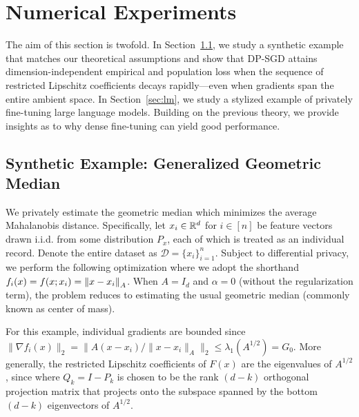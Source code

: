 \section{Numerical Experiments}\label{sec:experiments}
The aim of this section is twofold.
In Section~\ref{sec:synthetic}, we study a synthetic example that matches our theoretical assumptions and show that DP-SGD attains dimension-independent empirical and population loss when the sequence of restricted Lipschitz coefficients decays rapidly---even when gradients span the entire ambient space.
In Section~\ref{sec:lm}, we study a stylized example of privately fine-tuning large language models. 
Building on the previous theory, we provide insights as to why dense fine-tuning can yield good performance. 

\subsection{Synthetic Example: Generalized Geometric Median}\label{sec:synthetic}
We privately estimate the geometric median which minimizes the average Mahalanobis distance. 
Specifically, let $x_i \in \mathbb{R}^d$ for $i \in [n]$ be feature vectors drawn i.i.d. from some distribution $P_x$, each of which is treated as an individual record. 
Denote the entire dataset as $\mathcal{D} = \{ x_i\}_{i=1}^n$.
Subject to differential privacy, we perform the following optimization
where we adopt the shorthand $f_i(x) = f(x; x_i) = \left\lVert x - x_i\right\rVert_A$.
When $A = I_d$ and $\alpha=0$ (without the regularization term), the problem reduces to estimating the usual geometric median (commonly known as center of mass). 

For this example, individual gradients are bounded since $\| \nabla f_i( x ) \|_2 = \| A (x - x_i)  / \| x - x_i \|_A \|_2 \le \lambda_1(A^{1/2}) = G_0$.
More generally, the restricted Lipschitz coefficients of $F(x)$ are the eigenvalues of $A^{1/2}$, since 
where $Q_k = I - P_k$ is chosen to be the rank $(d-k)$ orthogonal projection matrix that projects onto the subspace spanned by the bottom $(d-k)$ eigenvectors of $A^{1/2}$.

